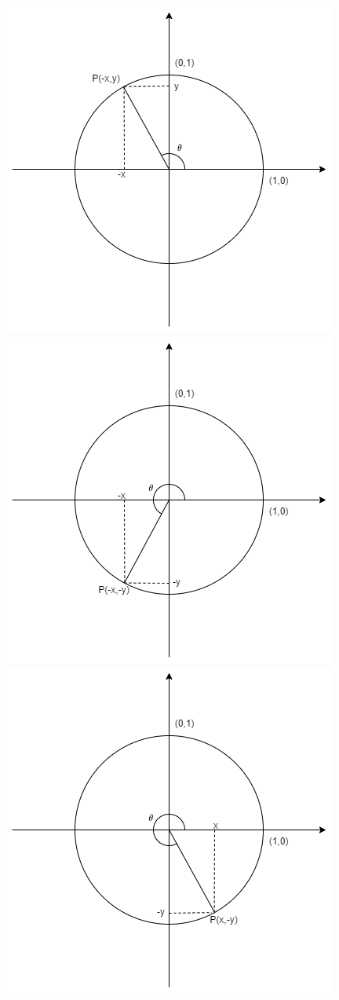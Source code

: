 \documentclass[12pt]{article}
\begin{document}
    \begin{figure}[H]
        \centering
        \includegraphics[scale=0.3]{circle2.png}
        \includegraphics[scale=0.3]{circle3.png}
        \includegraphics[scale=0.3]{circle4.png}

\end{figure}
\end{document}

